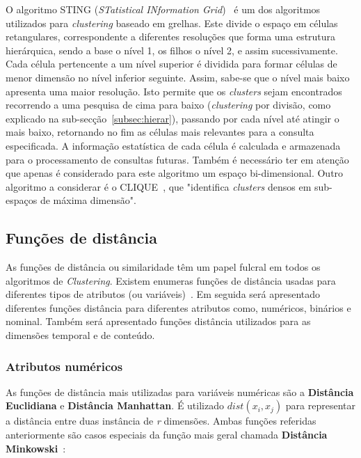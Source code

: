 O algoritmo STING (\textit{STatistical INformation Grid})~\citet{Wang1997} é um dos algoritmos utilizados para \textit{clustering} baseado em grelhas. Este divide o espaço em células retangulares, correspondente a diferentes resoluções que forma uma estrutura hierárquica, sendo a base o nível 1, os filhos o nível 2, e assim sucessivamente. Cada célula pertencente a um nível superior é dividida para formar células de menor dimensão no nível inferior seguinte. Assim, sabe-se que o nível mais baixo apresenta uma maior resolução. Isto permite que os \textit{clusters} sejam encontrados recorrendo a uma pesquisa de cima para baixo (\textit{clustering} por divisão, como explicado na sub-secção~\ref{subsec:hierar}), passando por cada nível até atingir o mais baixo, retornando no fim as células mais relevantes para a consulta especificada. A informação estatística de cada célula é calculada e armazenada para o processamento de consultas futuras. Também é necessário ter em atenção que apenas é considerado para este algoritmo um espaço bi-dimensional. Outro algoritmo a considerar é o CLIQUE~\citet{Agrawal1998}, que "identifica \textit{clusters} densos em sub-espaços de máxima dimensão".



\subsection{Funções de distância} \label{subsec:dist}

As funções de distância ou similaridade têm um papel fulcral em todos os algoritmos de \textit{Clustering}. Existem enumeras funções de distância usadas para diferentes tipos de atributos (ou variáveis)~\citet{Liu2011}. Em seguida será apresentado diferentes funções distância para diferentes atributos como, numéricos, binários e nominal. Também será apresentado funções distância utilizados para as dimensões temporal e de conteúdo. 

\subsubsection{Atributos numéricos}

As funções de distância mais utilizadas para variáveis numéricas são a \textbf{Distância Euclidiana} e \textbf{Distância Manhattan}. É utilizado $ dist(x_{i}, x_{j}) $ para representar a distância entre duas instância de \textit{r} dimensões. Ambas funções referidas anteriormente são casos especiais da função mais geral chamada \textbf{Distância Minkowski}~\citet{Liu2011}:

